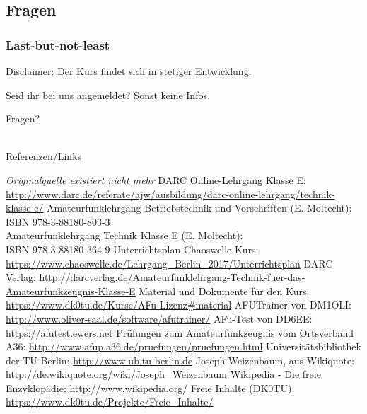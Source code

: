 \subsection{Fragen}

\begin{frame}
    \frametitle{Last-but-not-least}

    Disclaimer: Der Kurs findet sich in stetiger Entwicklung.

    \bigskip
    \pause

    Seid ihr bei uns angemeldet? Sonst keine Infos.

    \bigskip
    \pause

    Fragen?

\end{frame}

\renewcommand{\refname}{Referenzen}

\hypertarget{refs}{}
\textcolor{white}{} \\ %
\Large Referenzen/Links
\footnotesize

\begin{thebibliography}{}
      \emph{Originalquelle existiert nicht mehr}
      DARC Online-Lehrgang Klasse E:
                    \url{http://www.darc.de/referate/ajw/ausbildung/darc-online-lehrgang/technik-klasse-e/}
     Amateurfunklehrgang Betriebstechnik und Vorschriften (E. Moltecht): \\
                    ISBN 978-3-88180-803-3 \\
                    Amateurfunklehrgang Technik Klasse E (E. Moltecht): \\
                    ISBN 978-3-88180-364-9
      Unterrichtsplan Chaoswelle Kurs: \\
                    \url{https://www.chaoswelle.de/Lehrgang_Berlin_2017/Unterrichtsplan}
     DARC Verlag:
                    \url{http://darcverlag.de/Amateurfunklehrgang-Technik-fuer-das-Amateurfunkzeugnis-Klasse-E}
       Material und Dokumente für den Kurs:
                    \url{https://www.dk0tu.de/Kurse/AFu-Lizenz#material}
      AFUTrainer von DM1OLI:
                    \url{http://www.oliver-saal.de/software/afutrainer/}
      AFu-Test von DD6EE:
                    \url{https://afutest.ewers.net}
      Prüfungen zum Amateurfunkzeugnis vom Ortsverband A36:
                    \url{http://www.afup.a36.de/pruefungen/pruefungen.html}
        Universitätsbibliothek der TU Berlin:
                    \url{http://www.ub.tu-berlin.de}
     Joseph Weizenbaum, aus Wikiquote:
                    \url{http://de.wikiquote.org/wiki/Joseph_Weizenbaum}
        Wikipedia - Die freie Enzyklopädie:
                    \url{http://www.wikipedia.org/}
        Freie Inhalte (DK0TU):
                    \url{https://www.dk0tu.de/Projekte/Freie_Inhalte/}
\end{thebibliography} 


